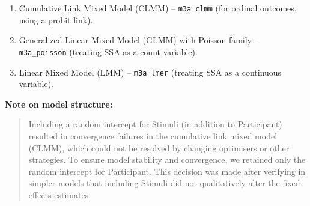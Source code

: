 \documentclass[
  bookmarksnumbered]{article}
\providecommand{\tightlist}{%
  \setlength{\itemsep}{0pt}\setlength{\parskip}{0pt}}
\begin{document}
\begin{enumerate}
\def\labelenumi{\arabic{enumi}.}
\tightlist
\item
  Cumulative Link Mixed Model (CLMM) -- \texttt{m3a\_clmm} (for ordinal outcomes, using a probit link).
\item
  Generalized Linear Mixed Model (GLMM) with Poisson family -- \texttt{m3a\_poisson} (treating SSA as a count variable).
\item
  Linear Mixed Model (LMM) -- \texttt{m3a\_lmer} (treating SSA as a continuous variable).
\end{enumerate}

\textbf{Note on model structure:}

\begin{quote}
Including a random intercept for Stimuli (in addition to Participant) resulted in convergence failures in the cumulative link mixed model (CLMM), which could not be resolved by changing optimisers or other strategies. To ensure model stability and convergence, we retained only the random intercept for Participant. This decision was made after verifying in simpler models that including Stimuli did not qualitatively alter the fixed‐effects estimates.
\end{quote}
\end{document}

